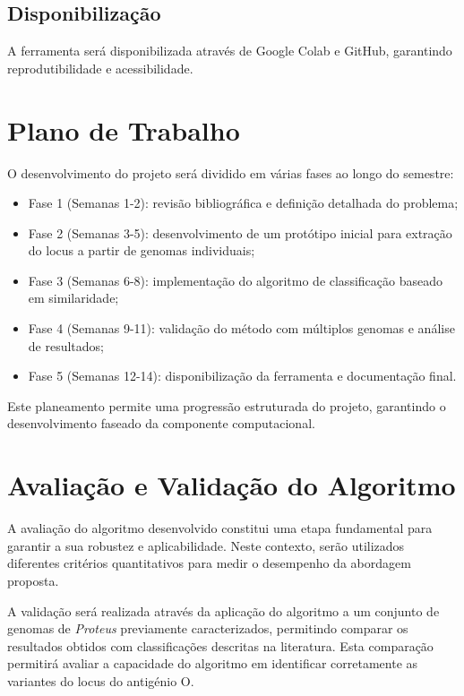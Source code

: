 \documentclass[a4paper,11pt]{article}
\begin{document}
\subsection{Disponibilização}

A ferramenta será disponibilizada através de Google Colab e GitHub, garantindo reprodutibilidade e acessibilidade.

\section{Plano de Trabalho}

O desenvolvimento do projeto será dividido em várias fases ao longo do semestre:

\begin{itemize}
    \item Fase 1 (Semanas 1-2): revisão bibliográfica e definição detalhada do problema;
    \item Fase 2 (Semanas 3-5): desenvolvimento de um protótipo inicial para extração do locus a partir de genomas individuais;
    \item Fase 3 (Semanas 6-8): implementação do algoritmo de classificação baseado em similaridade;
    \item Fase 4 (Semanas 9-11): validação do método com múltiplos genomas e análise de resultados;
    \item Fase 5 (Semanas 12-14): disponibilização da ferramenta e documentação final.
\end{itemize}

Este planeamento permite uma progressão estruturada do projeto, garantindo o desenvolvimento faseado da componente computacional.

\section{Avaliação e Validação do Algoritmo}

A avaliação do algoritmo desenvolvido constitui uma etapa fundamental para garantir a sua robustez e aplicabilidade. Neste contexto, serão utilizados diferentes critérios quantitativos para medir o desempenho da abordagem proposta.

A validação será realizada através da aplicação do algoritmo a um conjunto de genomas de \textit{Proteus} previamente caracterizados, permitindo comparar os resultados obtidos com classificações descritas na literatura. Esta comparação permitirá avaliar a capacidade do algoritmo em identificar corretamente as variantes do locus do antigénio O.
\end{document}
